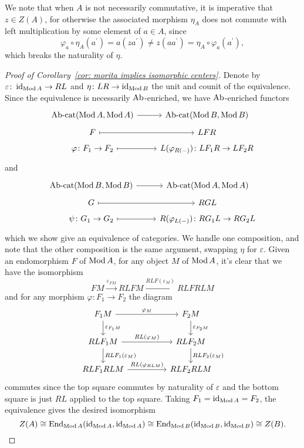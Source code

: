 \documentclass[reqno, 12pt]{amsart}
\begin{document}
\begin{remark}
  We note that when $A$ is not necessarily commutative, it is imperative that $z \in Z(A)$, for otherwise the associated morphism $\eta_A$ does not commute with left multiplication by some element of $a \in A$, since
  $$\varphi_a \circ \eta_A(a^\prime) = a(za^\prime) \neq z(aa^\prime) = \eta_A \circ \varphi_a(a^\prime),$$
  which breaks the naturality of $\eta$.
\end{remark}

\begin{proof}[Proof of Corollary~\ref{cor: morita implies isomorphic centers}]
  Denote by $\varepsilon \colon \operatorname{id}_{\operatorname{Mod}A} \to RL$ and $\eta \colon LR \to \operatorname{id}_{\operatorname{Mod}B}$ the unit and counit of the equivalence.
  Since the equivalence is necessarily $\operatorname{Ab}$-enriched, we have $\operatorname{Ab}$-enriched functors
  $$\begin{tikzcd}[row sep=tiny]
    \Abcat(\Mod{A},\Mod{A}) \arrow{r} & \Abcat(\Mod{B},\Mod{B})\\
    F \arrow[mapsto]{r} & LFR\\
    \varphi \colon F_1 \to F_2 \arrow[mapsto]{r} & L(\varphi_{R(-)}) \colon LF_1R \to LF_2R
  \end{tikzcd}$$
  and
  $$\begin{tikzcd}[row sep=tiny]
    \Abcat(\Mod{B},\Mod{B}) \arrow{r} & \Abcat(\Mod{A},\Mod{A})\\
    G \arrow[mapsto]{r} & RGL\\
    \psi \colon G_1 \to G_2 \arrow[mapsto]{r} & R(\varphi_{L(-)}) \colon RG_1L \to RG_2L
  \end{tikzcd}$$
  which we show give an equivalence of categories.
  We handle one composition, and note that the other composition is the same argument, swapping $\eta$ for $\varepsilon$.
  Given an endomorphism $F$ of $\operatorname{Mod}A$, for any object $M$ of $\operatorname{Mod}A$, it's clear that we have the isomorphism
  $$FM \overset{\varepsilon_{FM}}\longrightarrow RLFM \overset{RLF(\varepsilon_M)}\longrightarrow RLFRLM$$
  and for any morphism $\varphi \colon F_1 \to F_2$ the diagram
  $$\begin{tikzcd}[column sep=huge]
    F_1M \arrow{d}{\varepsilon_{F_1M}}\arrow{r}{\varphi_M} & F_2M\arrow{d}{\varepsilon_{F_2M}}\\
    RLF_1M \arrow{d}{RLF_1(\varepsilon_{M})}\arrow{r}{RL(\varphi_M)} & RLF_2M\arrow{d}{RLF_2(\varepsilon_M)}\\
    RLF_1RLM \arrow{r}{RL(\varphi_{RLM})} & RLF_2RLM
  \end{tikzcd}$$
  commutes since the top square commutes by naturality of $\varepsilon$ and the bottom square is just $RL$ applied to the top square.
  Taking $F_1 = \operatorname{id}_{\operatorname{Mod}A} = F_2$, the equivalence gives the desired isomorphism
  $$Z(A) \cong \operatorname{End}_{\operatorname{Mod}A}(\operatorname{id}_{\operatorname{Mod}A}, \operatorname{id}_{\operatorname{Mod}A}) \cong \operatorname{End}_{\operatorname{Mod}B}(\operatorname{id}_{\operatorname{Mod}B},\operatorname{id}_{\operatorname{Mod}B}) \cong Z(B).$$
\end{proof}
\end{document}
